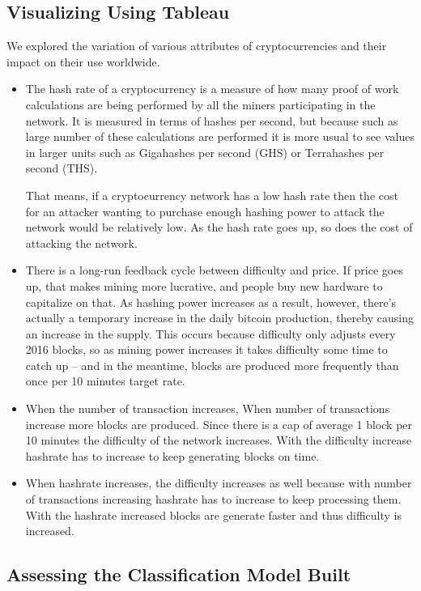 \documentclass{article}
\begin{document}
\subsection {Visualizing Using Tableau}
We explored the variation of various attributes of cryptocurrencies and their impact on their use worldwide. 
\begin{itemize}

\item The hash rate of a cryptocurrency is a measure of how many proof of work calculations are being performed by all the miners participating in the network. It is measured in terms of hashes per second, but because such as large number of these calculations are performed it is more usual to see values in larger units such as Gigahashes per second (GHS) or Terrahashes per second (THS).

That means, if a cryptocurrency network has a low hash rate then the cost for an attacker wanting to purchase enough hashing power to attack the network would be relatively low. As the hash rate goes up, so does the cost of attacking the network.

\item There is a long-run feedback cycle between difficulty and price. If price goes up, that makes mining more lucrative, and people buy new hardware to capitalize on that. As hashing power increases as a result, however, there’s actually a temporary increase in the daily bitcoin production, thereby causing an increase in the supply. This occurs because difficulty only adjusts every 2016 blocks, so as mining power increases it takes difficulty some time to catch up – and in the meantime, blocks are produced more frequently than once per 10 minutes target rate.

\item When the number of transaction increases, When number of transactions increase more blocks are produced. Since there is a cap of average 1 block per 10 minutes the difficulty of the network increases. With the difficulty increase hashrate has to increase to keep generating blocks on time.



\item When hashrate increases, the difficulty increases as well because with number of transactions increasing hashrate has to increase to keep processing them. With the hashrate increased blocks are generate faster and thus difficulty is increased.

\end{itemize}

\subsection {Assessing the  Classification Model Built}
\end{document}
